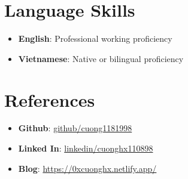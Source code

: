 \documentclass[letterpaper,11pt]{article}
\newcommand{\resumeItem}[2]{
  \item\small{
    \textbf{#1}{: #2 \vspace{-2pt}}
  }
}
\newcommand{\resumeSubItem}[2]{\resumeItem{#1}{#2}\vspace{-4pt}}
\newcommand{\resumeSubHeadingListStart}{\begin{itemize}[leftmargin=*]}
\newcommand{\resumeSubHeadingListEnd}{\end{itemize}}
\begin{document}
\section{Language Skills}
 \resumeSubHeadingListStart
  \resumeSubItem{English}
  {Professional working proficiency}
  \resumeSubItem{Vietnamese}
  {Native or bilingual proficiency}
 \resumeSubHeadingListEnd

 \section{References}
 \resumeSubHeadingListStart
  \resumeSubItem{Github}
  {\href{https://github.com/cuong1181998}{github/cuong1181998}}
  \resumeSubItem{Linked In}
  {\href{https://www.linkedin.com/in/cuonghx110898}{linkedin/cuonghx110898}}
  \resumeSubItem{Blog}
  {\href{https://0xcuonghx.netlify.app/}{https://0xcuonghx.netlify.app/}}
 \resumeSubHeadingListEnd
\end{document}
